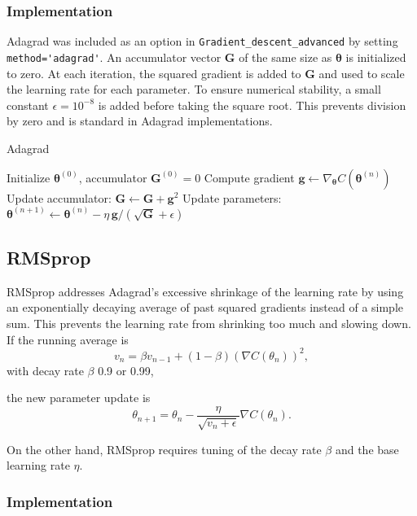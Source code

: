 \documentclass[
 reprint,            %
 amsmath,amssymb,
 aps,
]{revtex4-2}
\begin{document}
\subsubsection{Implementation}

Adagrad was included as an option in \verb|Gradient_descent_advanced| by setting \verb|method='adagrad'|. An accumulator vector $\mathbf{G}$ of the same size as $\boldsymbol{\theta}$ is initialized to zero. At each iteration, the squared gradient is added to $\mathbf{G}$ and used to scale the learning rate for each parameter.
To ensure numerical stability, a small constant $\epsilon=10^{-8}$ is added before taking the square root. This prevents division by zero and is standard in Adagrad implementations.
\begin{algorithm}[H]
\caption{Adagrad}
\begin{algorithmic}[1]
\State Initialize $\boldsymbol{\theta}^{(0)}$, accumulator $\mathbf{G}^{(0)}=0$
\State Compute gradient $\mathbf{g} \gets \nabla_{\boldsymbol{\theta}} C(\boldsymbol{\theta}^{(n)})$
\State Update accumulator: $\mathbf{G} \gets \mathbf{G} + \mathbf{g}^2$
\State Update parameters: $\boldsymbol{\theta}^{(n+1)} \gets \boldsymbol{\theta}^{(n)} - \eta \, \mathbf{g} / (\sqrt{\mathbf{G}}+\epsilon)$
\EndFor
\end{algorithmic}
\end{algorithm}

\subsection{RMSprop}

RMSprop addresses Adagrad's excessive shrinkage of the learning rate by using an exponentially decaying average of past squared gradients instead of a simple sum\cite{hjorthjensen_week37}.
This prevents the learning rate from shrinking too much and slowing down.  
If the running average is
\[
v_n = \beta v_{n-1} + (1 - \beta)\left( \nabla C(\theta_n) \right)^2,
\]
with decay rate \(\beta\) 0.9 or 0.99,

the new parameter update is
\[\theta_{n+1} = \theta_n - \frac{\eta}{\sqrt{v_n + \epsilon}} \nabla C(\theta_n).
\]

On the other hand, RMSprop requires tuning of the decay rate \(\beta\) and the base learning rate \(\eta\). \cite{goodfellow2016}

\subsubsection{Implementation}
\end{document}
